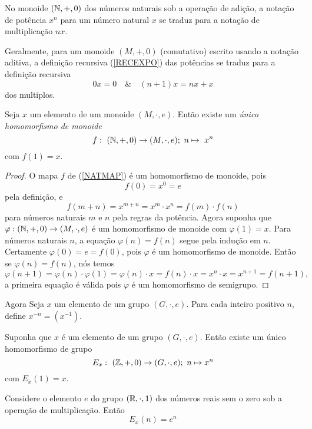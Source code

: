 \begin{definition}[Magma]
      No monoide $(\mathbb{N} , +, 0)$ dos números naturais sob a operação de adição, a notação de potência $x^{n}$ para um número natural $x$ se traduz para a notação de multiplicação $nx$.

      Geralmente, para um monoide $(M, +, 0)$ (comutativo) escrito usando a notação aditiva, a definição recursiva (\ref{RECEXPO}) das potências se traduz para a definição recursiva
      $$0x = 0\quad \&\quad (n+1)x = nx+x$$
      dos multiplos.

      \begin{theorem}
         Seja $x$ um elemento de um monoide $(M, \cdot, e)$. Então existe um \emph{único homomorfismo de monoide}
         \begin{equation}\label{NATMAP}
            f:\ (\mathbb{N}, +, 0) \to (M,\cdot, e);\ n \mapsto\ x^{n}
         \end{equation}
         com $f(1) = x.$
         \begin{proof}
            O mapa $f$ de (\ref{NATMAP}) é um homomorfismo de monoide, pois $$f(0) = x^{0} = e$$ pela definição, e $$f(m+n) = x^{m+n} = x^{m} \cdot x^{n} = f(m) \cdot f(n)$$ para números naturais $m$ e $n$ pela regras da potência.
            Agora suponha que $\varphi: (\mathbb{N}, +, 0) \to (M, \cdot , e)$ é um homomorfismo de monoide com $\varphi(1) = x$. Para números naturais $n$, a equação $\varphi(n) = f(n)$ segue pela indução em $n$. Certamente $\varphi(0) = e = f(0)$, pois $\varphi$ é um homomorfismo de monoide. Então se $\varphi(n) = f(n)$, nós temos 
            $$\varphi(n + 1) = \varphi(n) \cdot \varphi(1) = \varphi(n) \cdot x = f(n) \cdot x = x^{n} \cdot x = x^{n+1} = f(n + 1),$$
            a primeira equação é válida pois $\varphi$ é um homomorfismo de semigrupo.
         \end{proof}
      \end{theorem}
      Agora Seja $x$ um elemento de um grupo $(G,\cdot , e)$. Para cada inteiro positivo $n$, define $x^{-n} = (x^{-1})$. 
      \begin{theorem}
         Suponha que $x$ é um elemento de um grupo $(G,\cdot, e)$. Então existe um único homomorfismo de grupo
         \begin{equation}\label{EXPOGRUP}
            E_{x}:\ (\mathbb{Z}, +, 0) \to (G, \cdot, e);\ n \mapsto x^{n}
         \end{equation}
         com $E_{x}(1) = x.$
      \end{theorem}
      \begin{exmp}[Exponenciação]
         Considere o elemento $e$ do grupo $(\mathbb{R}, \cdot , 1)$ dos números reais sem o zero sob a operação de multiplicação. Então $$E_{x}(n) = e^{n}$$

\end{exmp}
\end{definition}
